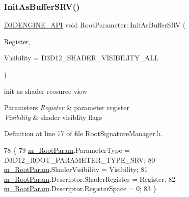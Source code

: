 \subsubsection{\texorpdfstring{Init\+As\+Buffer\+S\+R\+V()}{InitAsBufferSRV()}}
{\footnotesize\ttfamily \mbox{\hyperlink{stdafx_8h_a8ee2d990c5dfba7794dd2b60741d7722}{D3\+D\+E\+N\+G\+I\+N\+E\+\_\+\+A\+PI}} void Root\+Parameter\+::\+Init\+As\+Buffer\+S\+RV (\begin{DoxyParamCaption}\item[{U\+I\+NT}]{Register,  }\item[{D3\+D12\+\_\+\+S\+H\+A\+D\+E\+R\+\_\+\+V\+I\+S\+I\+B\+I\+L\+I\+TY}]{Visibility = {\ttfamily D3D12\+\_\+SHADER\+\_\+VISIBILITY\+\_\+ALL} }\end{DoxyParamCaption})\hspace{0.3cm}{\ttfamily [inline]}}



init as shader reosurce view 


\begin{DoxyParams}{Parameters}
{\em Register} & parameter register \\
\hline
{\em Visibility} & shader visiblity flags \\
\hline
\end{DoxyParams}


Definition at line 77 of file Root\+Signature\+Manager.\+h.


\begin{DoxyCode}
78     \{
79         \mbox{\hyperlink{class_root_parameter_a66f26d4bb3cd092c625bc083c508fe40}{m\_RootParam}}.ParameterType = D3D12\_ROOT\_PARAMETER\_TYPE\_SRV;
80         \mbox{\hyperlink{class_root_parameter_a66f26d4bb3cd092c625bc083c508fe40}{m\_RootParam}}.ShaderVisibility = Visibility;
81         \mbox{\hyperlink{class_root_parameter_a66f26d4bb3cd092c625bc083c508fe40}{m\_RootParam}}.Descriptor.ShaderRegister = Register;
82         \mbox{\hyperlink{class_root_parameter_a66f26d4bb3cd092c625bc083c508fe40}{m\_RootParam}}.Descriptor.RegisterSpace = 0;
83     \}
\end{DoxyCode}
\mbox{\label{class_root_parameter_ae9bb95035e93461a24c192921ebc461c}} 
